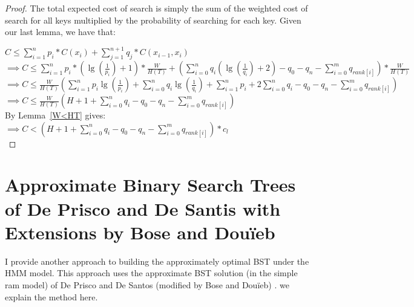 \documentclass[letterpaper,12pt,titlepage,oneside,final]{book}
\theoremstyle{plain}
\begin{document}
\begin{proof}
The total expected cost of search is simply the sum of the weighted cost of search for all keys multiplied by the probability of searching for each key. Given our last lemma, we have that:

$C \leq \sum_{i=1}^{n} p_i*C(x_i) + \sum_{j=1}^{n+1} q_j*C(x_{i-1},x_i)$ \\

$\implies C \leq \sum_{i=1}^{n} p_i*(\lg(\frac{1}{p_i})+1)*\frac{W}{H(T)} + (\sum_{i=0}^{n} q_i(\lg(\frac{1}{q_i})+2) - q_0 - q_n -  \sum_{i=0}^m q_{rank[i]} )*\frac{W}{H(T)} $ \\

$\implies C \leq \frac{W}{H(T)} (\sum_{i=1}^{n} p_i\lg(\frac{1}{p_i}) + \sum_{i=0}^{n} q_i\lg(\frac{1}{q_i}) + \sum_{i=1}^{n} p_i + 2\sum_{i=0}^{n} q_i - q_0 - q_n - \sum_{i=0}^m q_{rank[i]} )$ \\

$\implies C \leq  \frac{W}{H(T)} (H + 1 + \sum_{i=0}^n q_i - q_0 - q_n - \sum_{i=0}^m q_{rank[i]})$ \\

By Lemma~\ref{W<HT} gives: \\
$\implies C < (H + 1 + \sum_{i=0}^n q_i - q_0 - q_n - \sum_{i=0}^m q_{rank[i]}) * c_l$ \\

\end{proof}


\section{Approximate Binary Search Trees of De Prisco and De Santis with Extensions by Bose and Dou\"{i}eb} \label{sec:deBST}

I provide another approach to building the approximately optimal BST under the HMM model. This approach uses the approximate BST solution (in the simple ram model) of De Prisco and De Santos (modified by Bose and Dou\"{i}eb) \cite{de1993binary} \cite{bose2009efficient}. we explain the method here. \\
\end{document}
